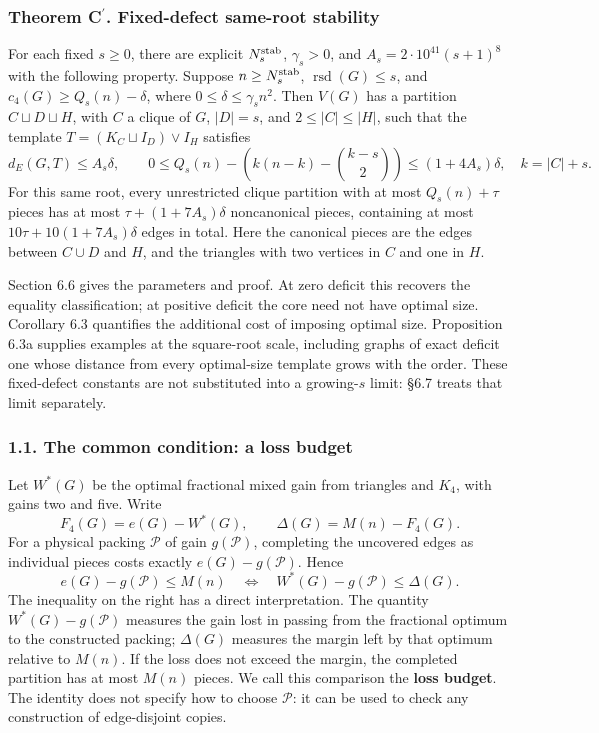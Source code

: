 \documentclass[english,11pt,a4paper]{article}
\begin{document}
\subsubsection{Theorem \texorpdfstring{C\ensuremath{^{\prime}}}{C'}. Fixed-defect same-root stability}\label{theorem-c.-fixed-defect-same-root-stability}

For each fixed \(s\ge0\), there are explicit \(N_s^{\rm stab}\), \(\gamma_s>0\), and \(A_s=2\cdot10^{41}(s+1)^8\) with the following property. Suppose \(n\ge N_s^{\rm stab}\), \(\operatorname{rsd}(G)\le s\), and \(c_4(G)\ge Q_s(n)-\delta\), where \(0\le\delta\le\gamma_s n^2\). Then \(V(G)\) has a partition \(C\sqcup D\sqcup H\), with \(C\) a clique of \(G\), \(|D|=s\), and \(2\le |C|\le |H|\), such that the template \(T=(K_C\sqcup I_D)\vee I_H\) satisfies \[
d_E(G,T)\le A_s\delta,\qquad
0\le Q_s(n)-\left(k(n-k)-\binom{k-s}{2}\right)\le(1+4A_s)\delta,
\quad k=|C|+s.
\] For this same root, every unrestricted clique partition with at most \(Q_s(n)+\tau\) pieces has at most \(\tau+(1+7A_s)\delta\) noncanonical pieces, containing at most \(10\tau+10(1+7A_s)\delta\) edges in total. Here the canonical pieces are the edges between \(C\cup D\) and \(H\), and the triangles with two vertices in \(C\) and one in \(H\).

Section 6.6 gives the parameters and proof. At zero deficit this recovers the equality classification; at positive deficit the core need not have optimal size. Corollary 6.3 quantifies the additional cost of imposing optimal size. Proposition 6.3a supplies examples at the square-root scale, including graphs of exact deficit one whose distance from every optimal-size template grows with the order. These fixed-defect constants are not substituted into a growing-\(s\) limit: §6.7 treats that limit separately.

\subsubsection{1.1. The common condition: a loss budget}\label{the-common-condition-a-loss-budget}

Let \(W^*(G)\) be the optimal fractional mixed gain from triangles and \(K_4\), with gains two and five. Write \[
F_4(G)=e(G)-W^*(G),\qquad \Delta(G)=M(n)-F_4(G).
\] For a physical packing \(\mathcal P\) of gain \(g(\mathcal P)\), completing the uncovered edges as individual pieces costs exactly \(e(G)-g(\mathcal P)\). Hence \[
\boxed{
e(G)-g(\mathcal P)\le M(n)
\quad\Longleftrightarrow\quad
W^*(G)-g(\mathcal P)\le\Delta(G).
}
\tag{1.3}
\] The inequality on the right has a direct interpretation. The quantity \(W^*(G)-g(\mathcal P)\) measures the gain lost in passing from the fractional optimum to the constructed packing; \(\Delta(G)\) measures the margin left by that optimum relative to \(M(n)\). If the loss does not exceed the margin, the completed partition has at most \(M(n)\) pieces. We call this comparison the \textbf{loss budget}. The identity does not specify how to choose \(\mathcal P\): it can be used to check any construction of edge-disjoint copies.
\end{document}
